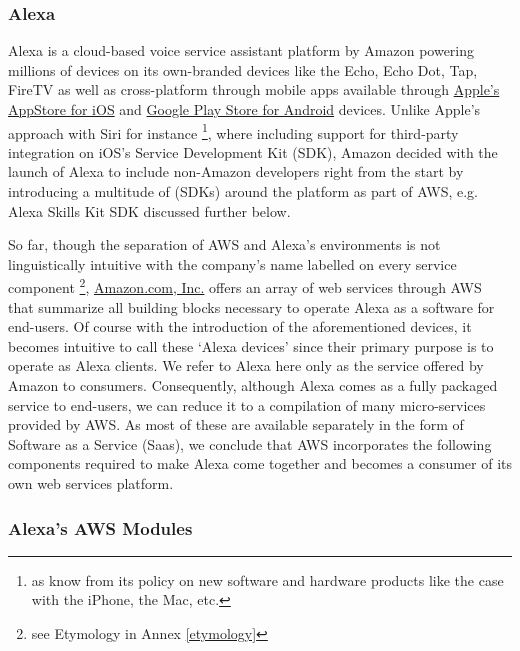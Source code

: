 \subsubsection*{Alexa}
Alexa is a cloud-based voice service assistant platform by Amazon powering millions of devices  on its own-branded devices like the Echo, Echo Dot, Tap, FireTV as well as cross-platform through mobile apps available through  \href{https://itunes.apple.com/de/app/amazon-alexa/id944011620?l=en&mt=8}{Apple's AppStore for iOS} and  \href{https://play.google.com/store/apps/details?id=com.amazon.dee.app&hl=en}{Google Play Store for Android} devices. Unlike Apple's approach with Siri for instance \footnote{as know from its policy on  new software and hardware products like the case with the iPhone, the Mac, etc.}, where including support for third-party integration on iOS's Service Development Kit (SDK), Amazon decided with the launch of Alexa to include non-Amazon developers right from the start by introducing a multitude of (SDKs) around the platform as part of AWS, e.g. Alexa Skills Kit SDK discussed further below.

So far, though the separation of AWS and Alexa's environments is not linguistically intuitive with the company's name labelled on every service component \footnote{see Etymology in Annex \ref{etymology}}, \href{http://www.amazon.com}{Amazon.com, Inc.} offers an array of web services through AWS that summarize all building blocks necessary to operate Alexa as a software for end-users. Of course with the introduction of the aforementioned devices, it becomes intuitive to call these `Alexa devices' since their primary purpose is to operate as Alexa clients. We refer to Alexa here only as the service offered by Amazon to consumers. Consequently, although Alexa comes as a fully packaged service to end-users, we can reduce it to a compilation of many micro-services provided by AWS. As most of these are available separately in the form of Software as a Service (Saas), we conclude that AWS incorporates the following components required to make Alexa come together and becomes a consumer of its own web services platform. 


\subsubsection*{Alexa's AWS Modules }

